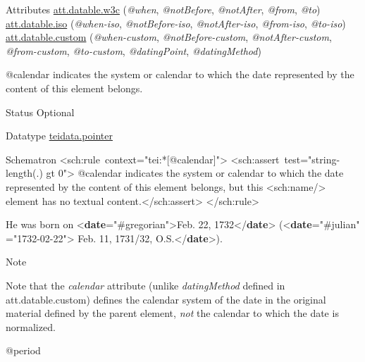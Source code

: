 \begin{reflist}
    \item[{Attributes}]
  \hyperref[TEI.att.datable.w3c]{att.datable.w3c} (\textit{@when}, \textit{@notBefore}, \textit{@notAfter}, \textit{@from}, \textit{@to}) \hyperref[TEI.att.datable.iso]{att.datable.iso} (\textit{@when-iso}, \textit{@notBefore-iso}, \textit{@notAfter-iso}, \textit{@from-iso}, \textit{@to-iso}) \hyperref[TEI.att.datable.custom]{att.datable.custom} (\textit{@when-custom}, \textit{@notBefore-custom}, \textit{@notAfter-custom}, \textit{@from-custom}, \textit{@to-custom}, \textit{@datingPoint}, \textit{@datingMethod}) \hfil\\[-10pt]\begin{sansreflist}
    \item[@calendar]
  indicates the system or calendar to which the date represented by the content of this element belongs.
\begin{reflist}
    \item[{Status}]
  Optional
    \item[{Datatype}]
  \hyperref[TEI.teidata.pointer]{teidata.pointer}
    \item[{Schematron}]
   <sch:rule context="tei:*[@calendar]"> <sch:assert test="string-length(.) gt 0"> @calendar indicates the system or calendar to  which the date represented by the content of this element belongs, but this <sch:name/> element has no textual content.</sch:assert> </sch:rule>
    \item[]\exampleFont He was born on {<\textbf{date}\hspace*{1em}{calendar}="{\#gregorian}">}Feb. 22, 1732{</\textbf{date}>} ({<\textbf{date}\hspace*{1em}{calendar}="{\#julian}"\mbox{}\newline 
\hspace*{1em}{when}="{1732-02-22}">} Feb. 11, 1731/32,\mbox{}\newline 
 O.S.{</\textbf{date}>}).
    \item[{Note}]
  \par
Note that the {\itshape calendar} attribute (unlike {\itshape datingMethod} defined in \textsf{att.datable.custom}) defines the calendar system of the date in the original material defined by the parent element, \textit{not} the calendar to which the date is normalized.
\end{reflist}  
    \item[@period]

\end{sansreflist}
\end{reflist}
